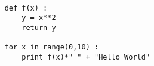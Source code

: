 \documentclass{article}
\begin{document}
\begin{verbatim}

    def f(x) :
        y = x**2
        return y
    
    for x in range(0,10) :
        print f(x)*" " + "Hello World"
\end{verbatim} 
\end{document}
